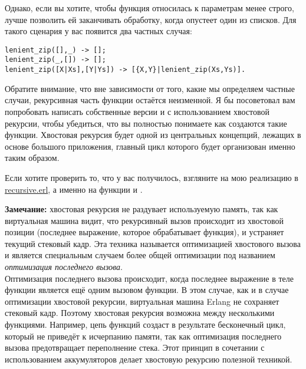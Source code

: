 Однако, если вы хотите, чтобы функция относилась к параметрам менее строго, лучше позволить ей заканчивать обработку, когда опустеет один из списков.
Для такого сценария у вас появится два частных случая:
\begin{lstlisting}[style=erlang]
lenient_zip([],_) -> [];
lenient_zip(_,[]) -> [];
lenient_zip([X|Xs],[Y|Ys]) -> [{X,Y}|lenient_zip(Xs,Ys)].
\end{lstlisting}

Обратите внимание, что вне зависимости от того, какие мы определяем частные случаи, рекурсивная часть функции остаётся неизменной.
Я бы посоветовал вам попробовать написать собственные версии  и  с использованием хвостовой рекурсии, чтобы убедиться, что вы полностью понимаете как создаются такие функции.
Хвостовая рекурсия будет одной из центральных концепций, лежащих в основе большого приложения, главный цикл которого будет организован именно таким образом.

Если хотите проверить то, что у вас получилось, взгляните на мою реализацию в \href{http://learnyousomeerlang.com/static/erlang/recursive.erl}{recursive.erl}, а именно на функции  и .
\colorbox{lgray}
{
    \begin{minipage}{\linewidth}
\textbf{Замечание:} хвостовая рекурсия не раздувает используемую память, так как виртуальная машина видит, что рекурсивный вызов происходит из хвостовой позиции (последнее выражение, которое обрабатывает функция), и устраняет текущий стековый кадр.
Эта техника называется оптимизацией хвостового вызова и является специальным случаем более общей оптимизации под названием \emph{оптимизация последнего вызова}.\\
Оптимизация последнего вызова происходит, когда последнее выражение в теле функции является ещё одним вызовом функции.
В этом случае, как и в случае оптимизации хвостовой рекурсии, виртуальная машина Erlang не сохраняет стековый кадр.
Поэтому хвостовая рекурсия возможна между несколькими функциями.
Например, цепь функций  создаст в результате бесконечный цикл, который не приведёт к исчерпанию памяти, так как оптимизация последнего вызова предотвращает переполнение стека.
Этот принцип в сочетании с использованием аккумуляторов делает хвостовую рекурсию полезной техникой.
    \end{minipage}
}
